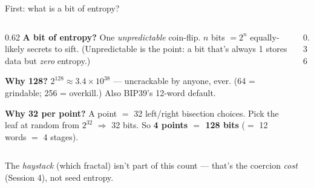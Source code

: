 \documentclass[aspectratio=169,11pt]{beamer}
\begin{document}
\begin{frame}{First: what is a bit of entropy?}
  \begin{columns}[T]
    \begin{column}{0.62\textwidth}
      \small
      \textbf{A bit of entropy?} One \emph{unpredictable} coin-flip. $n$ bits
      $=2^n$ equally-likely secrets to sift. (Unpredictable is the point: a bit
      that's always 1 stores data but \emph{zero} entropy.)
      \vspace{5pt}

      \textbf{Why 128?} $2^{128}\!\approx\!3.4\times10^{38}$ --- uncrackable by
      anyone, ever. (64 = grindable; 256 = overkill.) Also BIP39's 12-word
      default.
      \vspace{5pt}

      \textbf{Why 32 per point?} A point $=$ 32 left/right bisection choices. Pick
      the leaf at random from $2^{32}$ $\Rightarrow$ 32 bits. So
      \textbf{4 points $=$ 128 bits} ($=$ 12 words $=$ 4 stages).
    \end{column}
    \begin{column}{0.36\textwidth}
      \centering
    \end{column}
  \end{columns}
  \vspace{2pt}
  \begin{center}\footnotesize\color{graytext}
  The \emph{haystack} (which fractal) isn't part of this count --- that's the
  coercion \emph{cost} (Session 4), not seed entropy.
  \end{center}
\end{frame}
\end{document}
